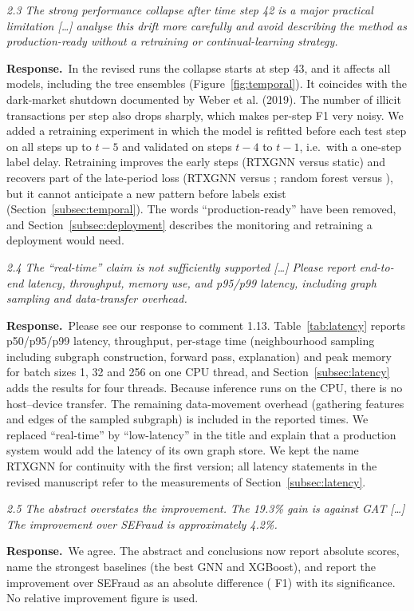 \documentclass[11pt]{article}
\newenvironment{comment}{\par\medskip\noindent\begin{minipage}{\linewidth}\itshape\color{black!75}}{\end{minipage}\par\smallskip}
\newcommand{\resp}{\par\noindent\textbf{Response.}\ }
\begin{document}
\begin{comment}
2.3 The strong performance collapse after time step 42 is a major practical limitation [\dots] analyse this drift more carefully and avoid describing the method as production-ready without a retraining or continual-learning strategy.
\end{comment}
\resp In the revised runs the collapse starts at step 43, and it affects all models, including the tree ensembles (Figure~\ref{fig:temporal}). It coincides with the dark-market shutdown documented by Weber et al. (2019). The number of illicit transactions per step also drops sharply, which makes per-step F1 very noisy. We added a retraining experiment in which the model is refitted before each test step on all steps up to $t-5$ and validated on steps $t-4$ to $t-1$, i.e.\ with a one-step label delay. Retraining improves the early steps (RTXGNN \rtxgnnRetrEarlyFone{} versus \rtxEarlyFone{} static) and recovers part of the late-period loss (RTXGNN \rtxgnnRetrLateFone{} versus \rtxgnnStaticLateFone; random forest \rfRetrLateFone{} versus \rfStaticLateFone), but it cannot anticipate a new pattern before labels exist (Section~\ref{subsec:temporal}). The words ``production-ready'' have been removed, and Section~\ref{subsec:deployment} describes the monitoring and retraining a deployment would need.

\begin{comment}
2.4 The ``real-time'' claim is not sufficiently supported [\dots] Please report end-to-end latency, throughput, memory use, and p95/p99 latency, including graph sampling and data-transfer overhead.
\end{comment}
\resp Please see our response to comment 1.13. Table~\ref{tab:latency} reports p50/p95/p99 latency, throughput, per-stage time (neighbourhood sampling including subgraph construction, forward pass, explanation) and peak memory for batch sizes 1, 32 and 256 on one CPU thread, and Section~\ref{subsec:latency} adds the results for four threads. Because inference runs on the CPU, there is no host--device transfer. The remaining data-movement overhead (gathering features and edges of the sampled subgraph) is included in the reported times. We replaced ``real-time'' by ``low-latency'' in the title and explain that a production system would add the latency of its own graph store. We kept the name RTXGNN for continuity with the first version; all latency statements in the revised manuscript refer to the measurements of Section~\ref{subsec:latency}.

\begin{comment}
2.5 The abstract overstates the improvement. The 19.3\% gain is against GAT [\dots] The improvement over SEFraud is approximately 4.2\%.
\end{comment}
\resp We agree. The abstract and conclusions now report absolute scores, name the strongest baselines (the best GNN and XGBoost), and report the improvement over SEFraud as an absolute difference (\deltaFOnesefraud{} F1) with its significance. No relative improvement figure is used.
\end{document}
